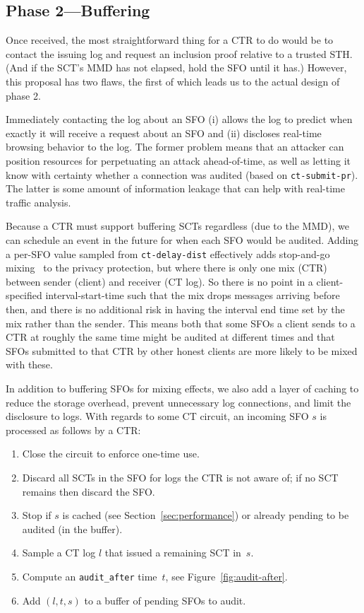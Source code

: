 \subsection{Phase 2---Buffering} \label{sec:base:phase2}

Once received, the most straightforward thing for a CTR to do would be to
contact the issuing log and request an inclusion proof relative to a trusted
STH\@. (And if the SCT's MMD has not elapsed, hold the SFO until it has.)
However, this proposal has two flaws, the first of which leads us to the actual
design of phase 2.

Immediately contacting the log about an SFO (i) allows the log to predict when
exactly it will receive a request about an SFO and (ii) discloses real-time
browsing behavior to the log. The former problem means that an attacker can
position resources for perpetuating an attack ahead-of-time, as well as letting
it know with certainty whether a connection was audited (based on
\texttt{ct-submit-pr}). The latter is some amount of information leakage that
can help with real-time traffic analysis.

Because a CTR must support buffering SCTs regardless (due to the MMD), we can
schedule an event in the future for when each SFO would be audited. Adding a
per-SFO value sampled from \texttt{ct-delay-dist} effectively adds stop-and-go
mixing~\cite{kesdogan:ih1998} to the privacy protection, but where there is only
one mix (CTR) between sender (client) and receiver (CT log). So there is no
point in a client-specified interval-start-time such that the mix drops messages
arriving before then, and there is no additional risk in having the interval end
time set by the mix rather than the sender. This means both that some SFOs a
client sends to a CTR at roughly the same time might be audited at different
times and that SFOs submitted to that CTR by other honest clients are more
likely to be mixed with these.

In addition to buffering SFOs for mixing effects, we also add a layer of caching
to reduce the storage overhead, prevent unnecessary log connections, and limit
the disclosure to logs. With regards to some CT circuit, an incoming SFO $s$ is
processed as follows by a CTR:
\begin{enumerate}
    \item\label{enm:storage:close} Close the circuit to enforce one-time use.
    \item\label{enm:storage:unrecognized} Discard all SCTs in the SFO for logs
        the CTR is not aware of; if no SCT remains then discard the SFO\@.
    \item\label{enm:storage:cached} Stop if $s$ is cached (see
        Section~\ref{sec:performance}) or already pending to be audited (in the
        buffer).
    \item\label{enm:storage:fix-log} Sample a CT log $l$ that issued a
        remaining SCT in~$s$.
    \item\label{enm:storage:audit-after} Compute an \texttt{audit\_after}
		time~$t$, see Figure~\ref{fig:audit-after}.
    \item\label{enm:storage:store} Add $(l,t,s)$ to a buffer of pending SFOs to
    audit.
\end{enumerate}

